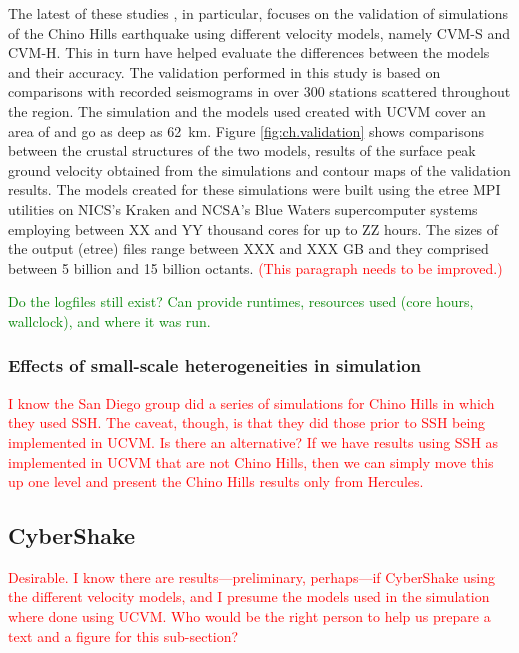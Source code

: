 The latest of these studies \citep{Taborda_2014_BSSA}, in particular, focuses on the validation of simulations of the Chino Hills earthquake using different velocity models, namely CVM-S and CVM-H. This in turn have helped evaluate the differences between the models and their accuracy. The validation performed in this study is based on comparisons with recorded seismograms in over 300 stations scattered throughout the region. The simulation and the models used created with UCVM cover an area of  and go as deep as 62~km. Figure \ref{fig:ch.validation} shows comparisons between the crustal structures of the two models, results of the surface peak ground velocity obtained from the simulations and contour maps of the validation results. The models created for these simulations were built using the etree MPI utilities on NICS's Kraken and NCSA's Blue Waters supercomputer systems employing between XX and YY thousand cores for up to ZZ hours. The sizes of the output (etree) files range between XXX and XXX GB and they comprised between 5 billion and 15 billion octants. \textcolor{red}{(This paragraph needs to be improved.)}

\textcolor{green}{Do the logfiles still exist? Can provide runtimes, resources used (core hours, wallclock), and where it was run.}



\subsubsection{Effects of small-scale heterogeneities in simulation}
\label{sec:ch-ssh}

\textcolor{red}{I know the San Diego group did a series of simulations for Chino Hills in which they used SSH.  The caveat, though, is that they did those prior to SSH being implemented in UCVM.  Is there an alternative? If we have results using SSH as implemented in UCVM that are not Chino Hills, then we can simply move this up one level and present the Chino Hills results only from Hercules.}

\subsection{CyberShake}

\textcolor{red}{Desirable. I know there are results---preliminary, perhaps---if CyberShake using the different velocity models, and I presume the models used in the simulation where done using UCVM. Who would be the right person to help us prepare a text and a figure for this sub-section?}

